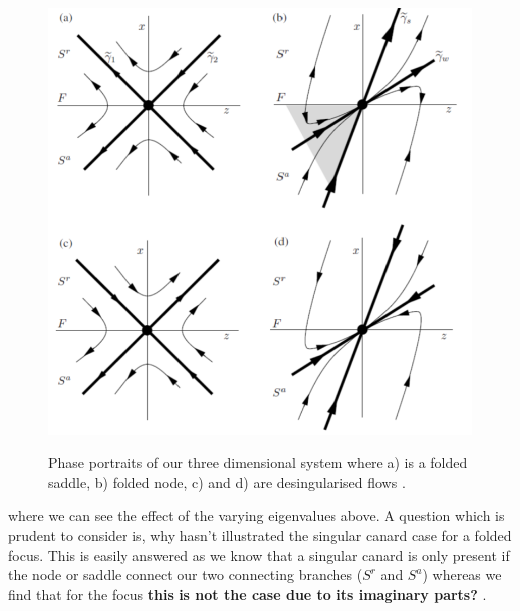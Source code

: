 \begin{figure}[h!]\centering
	\includegraphics[height=12cm,width=12cm]{Images/foldednodesetc}
	\caption{Phase portraits of our three dimensional system where a) is a folded saddle, b) folded node, c) and d) are desingularised flows \citep{MMO}.}
	\label{fig: folded singularities}
\end{figure}%
where we can see the effect of the varying eigenvalues above. A question which is prudent to consider is, why hasn't \citep{MMO} illustrated the singular canard case for a folded focus. This is easily answered as we know that a singular canard is only present if the node or saddle connect our two connecting branches ($ S^r $ and $ S^a $) whereas we find that for the focus \textbf{this is not the case due to its imaginary parts?} \citep{MMO}.
